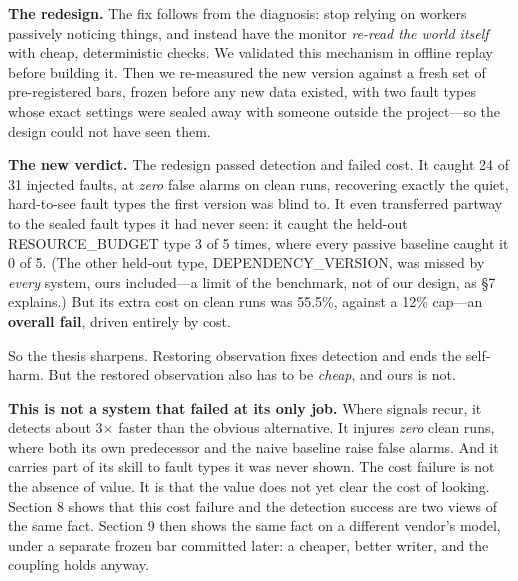 \documentclass[acmsmall,screen]{acmart}
\begin{document}
\textbf{The redesign.} The fix follows from the diagnosis: stop relying on
workers passively noticing things, and instead have the monitor \emph{re-read
the world itself} with cheap, deterministic checks. We validated this mechanism
in offline replay before building it. Then we re-measured the new version
against a fresh set of pre-registered bars, frozen before any new data existed,
with two fault types whose exact settings were sealed away with someone outside
the project---so the design could not have seen them.

\textbf{The new verdict.} The redesign passed detection and failed cost. It
caught 24 of 31 injected faults, at \emph{zero} false alarms on clean runs,
recovering exactly the quiet, hard-to-see fault types the first version was
blind to. It even transferred partway to the sealed fault types it had never
seen: it caught the held-out RESOURCE\_BUDGET type 3 of 5 times, where every
passive baseline caught it 0 of 5. (The other held-out type,
DEPENDENCY\_VERSION, was missed by \emph{every} system, ours included---a limit
of the benchmark, not of our design, as \S7 explains.) But its extra cost on
clean runs was 55.5\%, against a 12\% cap---an \textbf{overall fail}, driven
entirely by cost.

So the thesis sharpens. Restoring observation fixes detection and ends the
self-harm. But the restored observation also has to be \emph{cheap}, and ours
is not.

\textbf{This is not a system that failed at its only job.} Where signals
recur, it detects about 3$\times$ faster than the obvious alternative. It
injures \emph{zero} clean runs, where both its own predecessor and the naive
baseline raise false alarms. And it carries part of its skill to fault types it
was never shown. The cost failure is not the absence of value. It is that the
value does not yet clear the cost of looking. Section 8 shows that this cost
failure and the detection success are two views of the same fact. Section 9 then
shows the same fact on a different vendor's model, under a separate frozen bar
committed later: a cheaper, better writer, and the coupling holds anyway.
\end{document}
